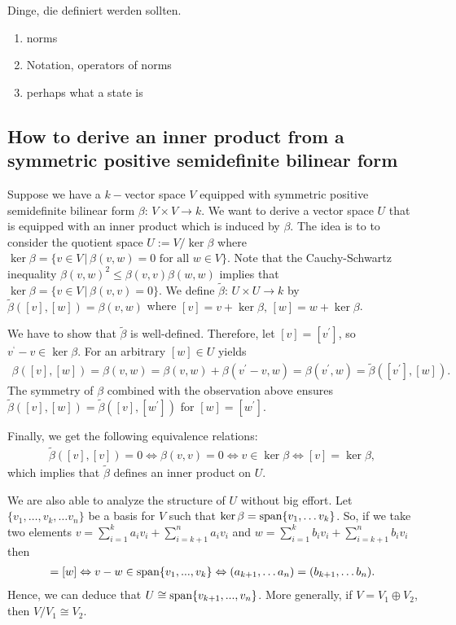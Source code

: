 Dinge, die definiert werden sollten. 
\begin{enumerate}
	\item norms
	\item Notation, operators of norms 
	\item  perhaps what a state is 
\end{enumerate}


\subsection{How to derive an inner product from a symmetric positive semidefinite bilinear form}
Suppose we have a $ k- $vector space $ V $ equipped with symmetric positive semidefinite bilinear form $ \beta: \, V \times V \to k $. We want to derive a vector space $ U $ that is equipped with an inner product which is induced by $ \beta $. The idea is to to consider the quotient space $ U:=V/\ker\beta $ where $ \ker \beta = \{ v \in V \, | \, \beta(v,w)= 0 \text{ for all } w \in V \} $. Note that the Cauchy-Schwartz inequality $ \beta(v,w)^2 \le \beta(v,v)\beta(w,w) $ implies that 
$ \ker \beta = \{ v \in V \, | \, \beta(v,v)= 0 \} $.
We define $ \tilde{\beta}:  \, U \times U \to k $ by $ \tilde{\beta}([v],[w]) = \beta(v,w) $ where $ [v] = v + \ker\beta, \,$$[w]=w+\ker\beta$.

We have to show that $ \tilde{\beta} $ is well-defined. Therefore, let $ [v]=[v^{'}] $, so $v^{‘}-v \in \ker \beta $. 
For an arbitrary $ [w] \in U $ yields 
\begin{align*}
	\beta([v],[w]) = \beta(v,w) = \beta(v,w)+\beta(v^{'}-v,w)= \beta(v^{'},w) = \tilde{\beta}([v^{'}],[w]).
\end{align*}
The symmetry of $ \beta $ combined with the observation above ensures $ \tilde{\beta}([v],[w]) = \tilde{\beta}([v],[w^{'}]) $ for $ [w]= [w^{'}] $.

Finally, we get the following equivalence relations: 
\begin{align*}
	\tilde{\beta}([v],[v]) = 0 \Leftrightarrow \beta(v,v) = 0 \Leftrightarrow v \in \ker \beta \Leftrightarrow [v]= \ker \beta,
\end{align*}
which implies that $ \tilde{\beta} $ defines an inner product on $ U $. 

We are also able to analyze the structure of $ U $ without big effort. Let $ \{ v_1,\hdots,v_k, \hdots v_n \} $ be a basis for $ V $ such that $ \ker \beta = \textup{span} \{ v_1,\hdots v_k \}$. So, if we take two elements 
$ v = \sum_{i=1}^{k}a_iv_i + \sum_{i=k+1}^{n}a_iv_i$ and $ w = \sum_{i=1}^{k}b_iv_i + \sum_{i=k+1}^{n}b_iv_i $ then 
\begin{align*}
	[v] = [w] \Leftrightarrow v-w \in \textup{span} \{  v_1,...,v_k \} \Leftrightarrow (a_{k+1},\hdots a_n) = (b_{k+1},\hdots b_n).
\end{align*} 
Hence, we can deduce that $ U \cong \textup{span} \{ v_{k+1},...,v_n \} $. More generally, if $ V = V_1 \oplus V_2 $, then $ V/V_1 \cong V_2 $.